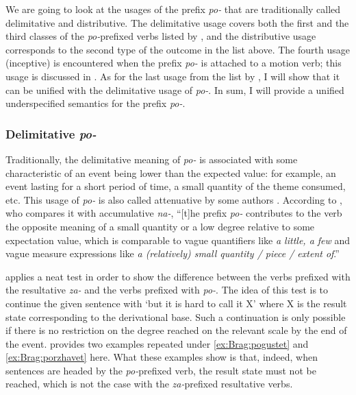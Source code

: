 We are going to look at the usages of the prefix \textit{po-} that are traditionally called delimitative and distributive. The delimitative usage covers both the first and the third classes of the \textit{po-}prefixed verbs listed by \citet{Shvedova:82}, and the distributive usage corresponds to the second type of the outcome in the list above. The fourth usage (inceptive) is encountered when the prefix \textit{po-} is attached to a motion verb; this usage is discussed in \citealt{ZinovaOsswald:paper}. As for the last usage from the list by \citet{Shvedova:82}, I will show that it can be unified with the delimitative usage of \textit{po-}. In sum, I will provide a unified underspecified semantics for the prefix \textit{po-}.

\subsubsection{Delimitative \textit{po-}}
Traditionally, the delimitative meaning of \textit{po-} is associated with some characteristic of an event being lower than the expected value: for example, an event lasting for a short period of time, a small quantity of the theme consumed, etc. This usage of \textit{po-} is also called attenuative by some authors \citep[e.g.][]{Svenonius:04b}. According to \citet[47--48]{Filip:00}, who compares it with accumulative \textit{na-}, ``[t]he prefix \textit{po-} contributes to the verb the opposite meaning of a small quantity or a low degree relative to some expectation value, which is comparable to vague quantifiers like \textit{a little, a few} and vague measure expressions like \textit{a (relatively) small quantity / piece / extent of}.''

\citet[183]{Braginsky:08} applies a neat test in order to show the difference between the verbs prefixed with the resultative \textit{za-} and the verbs prefixed with \textit{po-}. The idea of this test is to continue the given sentence with `but it is hard to call it X' where X is the result state corresponding to the derivational base. Such a continuation is only possible if there is no restriction on the degree reached on the relevant scale by the end of the event. \citet[183]{Braginsky:08} provides two examples repeated under \ref{ex:Brag:pogustet} and \ref{ex:Brag:porzhavet} here. What these examples show is that, indeed, when sentences are headed by the \textit{po-}prefixed verb, the result state must not be reached, which is not the case with the \textit{za-}prefixed resultative verbs.

